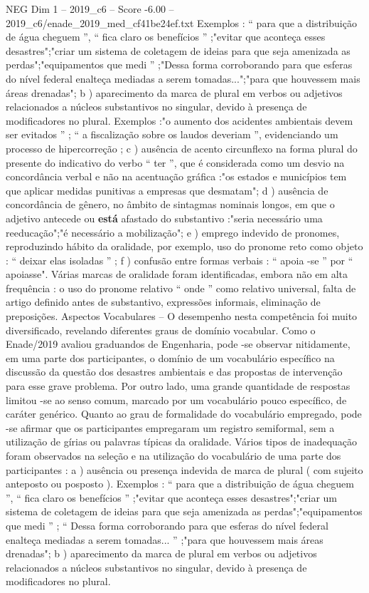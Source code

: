 \begin{textsample}{NEG Dim 1 – 2019\_c6 – Score -6.00 – 2019\_c6/enade\_2019\_med\_cf41be24ef.txt}
Exemplos : “ para que a distribuição de água cheguem ”, “ fica claro os benefícios ” ;"evitar que aconteça esses desastres";"criar um sistema de coletagem de ideias para que seja amenizada as perdas";"equipamentos que medi ” ;"Dessa forma corroborando para que esferas do nível federal enalteça mediadas a serem tomadas...";"para que houvessem mais áreas drenadas"; b ) aparecimento da marca de plural em verbos ou adjetivos relacionados a núcleos substantivos no singular, devido à presença de modificadores no plural.
Exemplos :"o aumento dos acidentes ambientais devem ser evitados ” ; “ a fiscalização sobre os laudos deveriam ”, evidenciando um processo de hipercorreção ; c ) ausência de acento circunflexo na forma plural do presente do indicativo do verbo “ ter ”, que é considerada como um desvio na concordância verbal e não na acentuação gráfica :"os estados e municípios tem que aplicar medidas punitivas a empresas que desmatam"; d ) ausência de concordância de gênero, no âmbito de sintagmas nominais longos, em que o adjetivo antecede ou \textbf{está} afastado do substantivo :"seria necessário uma reeducação";"é necessário a mobilização"; e ) emprego indevido de pronomes, reproduzindo hábito da oralidade, por exemplo, uso do pronome reto como objeto : “ deixar elas isoladas ” ; f ) confusão entre formas verbais : “ apoia -se ” por “ apoiasse".
Várias marcas de oralidade foram identificadas, embora não em alta frequência : o uso do pronome relativo “ onde ” como relativo universal, falta de artigo definido antes de substantivo, expressões informais, eliminação de preposições.
Aspectos Vocabulares – O desempenho nesta competência foi muito diversificado, revelando diferentes graus de domínio vocabular.
Como o Enade/2019 avaliou graduandos de Engenharia, pode -se observar nitidamente, em uma parte dos participantes, o domínio de um vocabulário específico na discussão da questão dos desastres ambientais e das propostas de intervenção para esse grave problema.
Por outro lado, uma grande quantidade de respostas limitou -se ao senso comum, marcado por um vocabulário pouco específico, de caráter genérico.
Quanto ao grau de formalidade do vocabulário empregado, pode -se afirmar que os participantes empregaram um registro semiformal, sem a utilização de gírias ou palavras típicas da oralidade.
Vários tipos de inadequação foram observados na seleção e na utilização do vocabulário de uma parte dos participantes : a ) ausência ou presença indevida de marca de plural ( com sujeito anteposto ou posposto ).
Exemplos : “ para que a distribuição de água cheguem ”, “ fica claro os benefícios ” ;"evitar que aconteça esses desastres";"criar um sistema de coletagem de ideias para que seja amenizada as perdas";"equipamentos que medi ” ; “ Dessa forma corroborando para que esferas do nível federal enalteça mediadas a serem tomadas... ” ;"para que houvessem mais áreas drenadas"; b ) aparecimento da marca de plural em verbos ou adjetivos relacionados a núcleos substantivos no singular, devido à presença de modificadores no plural.

\end{textsample}
